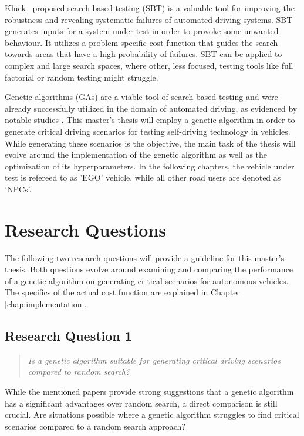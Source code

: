 Klück~\cite{kluck_search-based_2022} proposed search based testing (SBT) is a valuable tool for improving the robustness and revealing systematic failures of automated driving systems. SBT generates inputs for a system under test in order to provoke some unwanted behaviour. It utilizes a problem-specific cost function that guides the search towards areas that have a high probability of failures. SBT can be applied to complex and large search spaces, where other, less focused, testing tools like full factorial or random testing might struggle.

Genetic algorithms (GAs) are a viable tool of search based testing and were already successfully utilized in the domain of automated driving, as evidenced by notable studies \cite{felbinger_comparing_2019, klampfl_using_nodate, kaufmann_critical_2021, almanee_scenorita_2021}. This master's thesis will employ a genetic algorithm in order to generate critical driving scenarios for testing self-driving technology in vehicles. While generating these scenarios is the objective, the main task of the thesis will evolve around the implementation of the genetic algorithm as well as the optimization of its hyperparameters. In the following chapters, the vehicle under test is refereed to as 'EGO' vehicle, while all other road users are denoted as 'NPCs'.

\section{Research Questions}
The following two research questions will provide a guideline for this master's thesis. Both questions evolve around examining and comparing the performance of a genetic algorithm on generating critical scenarios for autonomous vehicles. The specifics of the actual cost function are explained in Chapter \ref{chap:implementation}.

\subsection{Research Question 1}
\begin{quote}
	\begin{em}
		\textit{Is a genetic algorithm suitable for generating critical driving scenarios compared to random search?}
	\end{em}
\end{quote}

While the mentioned papers provide strong suggestions that a genetic algorithm has a significant advantages over random search, a direct comparison is still crucial. Are situations possible where a genetic algorithm struggles to find critical scenarios compared to a random search approach?


